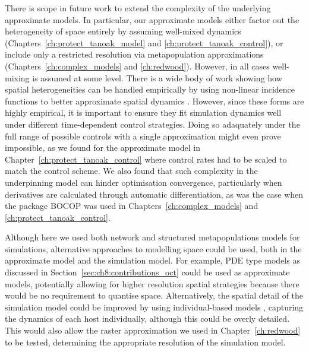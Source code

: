 There is scope in future work to extend the complexity of the underlying approximate models. In particular, our approximate models either factor out the heterogeneity of space entirely by assuming well-mixed dynamics (Chapters~\ref{ch:protect_tanoak_model} and \ref{ch:protect_tanoak_control}), or include only a restricted resolution via metapopulation approximations (Chapters~\ref{ch:complex_models} and \ref{ch:redwood}). However, in all cases well-mixing is assumed at some level. There is a wide body of work showing how spatial heterogeneities can be handled empirically by using non-linear incidence functions to better approximate spatial dynamics \citep[e.g.][]{liu_influence_1986, clarke_approximating_2013, chowell_mathematical_2016,chowell_using_2016}. However, since these forms are highly empirical, it is important to ensure they fit simulation dynamics well under different time-dependent control strategies. Doing so adaquately under the full range of possible controls with a single approximation might even prove impossible, as we found for the approximate model in Chapter~\ref{ch:protect_tanoak_control} where control rates had to be scaled to match the control scheme. We also found that such complexity in the underpinning model can hinder optimisation convergence, particularly when derivatives are calculated through automatic differentiation, as was the case when the package BOCOP was used in Chapters~\ref{ch:complex_models} and \ref{ch:protect_tanoak_control}.

Although here we used both network and structured metapopulations models for simulations, alternative approaches to modelling space could be used, both in the approximate model and the simulation model. For example, PDE type models as discussed in Section~\ref{sec:ch8:contributions_oct} \citep[e.g.][]{white_role_2006,neilan_optimal_2011,miyaoka_optimal_2019} could be used as approximate models, potentially allowing for higher resolution spatial strategies because there would be no requirement to quantise space. Alternatively, the spatial detail of the simulation model could be improved by using individual-based models \citep[e.g.][]{cook_constructing_2008,cunniffe_optimising_2015}, capturing the dynamics of each host individually, although this could be overly detailed. This would also allow the raster approximation we used in Chapter~\ref{ch:redwood} to be tested, determining the appropriate resolution of the simulation model.

